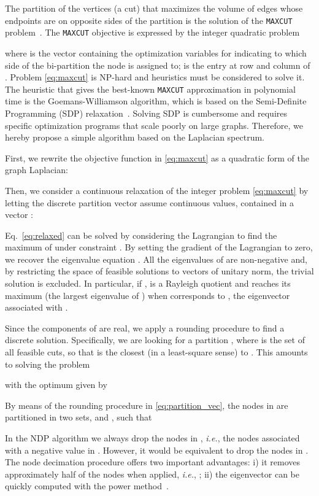 \documentclass[journal]{IEEEtran}
\newcommand{\maxcut}{\texttt{\small{MAXCUT}}}
\begin{document}
The partition of the vertices (a cut) that maximizes the volume of edges whose endpoints are on opposite sides of the partition is the solution of the \maxcut{} problem~\cite{palagi2012computational}.
The \maxcut{} objective is expressed by the integer quadratic problem

where  is the vector containing the optimization variables  for  indicating to which side of the bi-partition the node  is assigned to;  is the entry at row  and column  of .
Problem \eqref{eq:maxcut} is NP-hard and heuristics must be considered to solve it.
The heuristic that gives the best-known \maxcut{} approximation in polynomial time is the Goemans-Williamson algorithm, which is based on the Semi-Definite Programming (SDP) relaxation~\cite{goemans1995improved}.
Solving SDP is cumbersome and requires specific optimization programs that scale poorly on large graphs.
Therefore, we hereby propose a simple algorithm based on the Laplacian spectrum.

First, we rewrite the objective function in \eqref{eq:maxcut} as a quadratic form of the graph Laplacian:


Then, we consider a continuous relaxation of the integer problem \eqref{eq:maxcut} by letting the discrete partition vector  assume continuous values, contained in a vector :


Eq.~\ref{eq:relaxed} can be solved by considering the Lagrangian  to find the maximum of  under constraint . 
By setting the gradient of the Lagrangian to zero, we recover the eigenvalue equation .
All the eigenvalues of  are non-negative and, by restricting the space of feasible solutions to vectors of unitary norm, the trivial solution  is excluded.
In particular, if ,  is a Rayleigh quotient and reaches its maximum  (the largest eigenvalue of ) when  corresponds to , the eigenvector associated with .

Since the components of  are real, we apply a rounding procedure to find a discrete solution.
Specifically, we are looking for a partition , where  is the set of all feasible cuts, so that  is the closest (in a least-square sense) to .
This amounts to solving the problem

with the optimum given by




By means of the rounding procedure in \eqref{eq:partition_vec}, the nodes in  are partitioned in two sets,  and , such that

In the NDP algorithm we always drop the nodes in , \textit{i.e.}, the nodes associated with a negative value in . 
However, it would be equivalent to drop the nodes in .
The node decimation procedure offers two important advantages: 
i) it removes approximately half of the nodes when applied, \textit{i.e.}, ; 
ii) the eigenvector  can be quickly computed with the power method~\cite{bianchi2017agent}.
\end{document}
